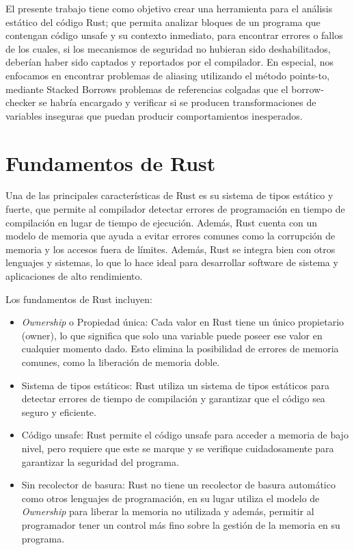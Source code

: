 El presente trabajo tiene como objetivo crear una herramienta para el análisis estático del código Rust; que permita analizar bloques de un programa que contengan código unsafe y su contexto inmediato, para encontrar errores o fallos de los cuales, si los mecanismos de seguridad no hubieran sido deshabilitados, deberían haber sido captados y reportados por el compilador. En especial, nos enfocamos en encontrar problemas de aliasing utilizando el método points-to, mediante Stacked Borrows problemas de referencias colgadas que el borrow-checker se habría encargado y verificar si se producen transformaciones de variables inseguras que puedan producir comportamientos inesperados.


\section{Fundamentos de Rust}

Una de las principales características de Rust es su sistema de tipos estático y fuerte, que permite al compilador detectar errores de programación en tiempo de compilación en lugar de tiempo de ejecución. Además, Rust cuenta con un modelo de memoria que ayuda a evitar errores comunes como la corrupción de memoria y los accesos fuera de límites.
Además, Rust se integra bien con otros lenguajes y sistemas, lo que lo hace ideal para desarrollar software de sistema y aplicaciones de alto rendimiento.

Los fundamentos de Rust incluyen:
\begin{itemize}
  \item \textit{Ownership} o Propiedad única: Cada valor en Rust tiene un único propietario (owner), lo que significa que solo una variable puede poseer ese valor en cualquier momento dado. Esto elimina la posibilidad de errores de memoria comunes, como la liberación de memoria doble.
  \item Sistema de tipos estáticos: Rust utiliza un sistema de tipos estáticos para detectar errores de tiempo de compilación y garantizar que el código sea seguro y eficiente.
  \item Código unsafe: Rust permite el código unsafe para acceder a memoria de bajo nivel, pero requiere que este se marque y se verifique cuidadosamente para garantizar la seguridad del programa.
  \item Sin recolector de basura: Rust no tiene un recolector de basura automático como otros lenguajes de programación, en su lugar utiliza el modelo de \textit{Ownership} para liberar la memoria no utilizada y además, permitir al programador tener un control más fino sobre la gestión de la memoria en su programa.
\end{itemize}  

